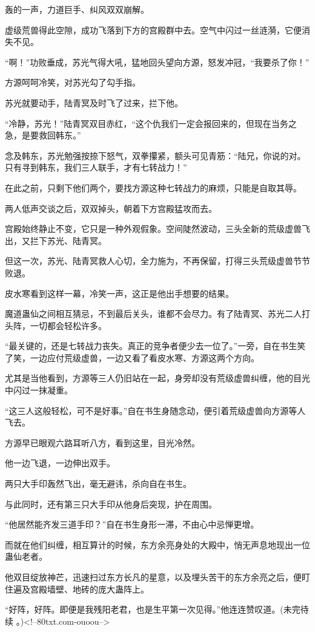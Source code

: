 \begin{this_body}
轰的一声，力道巨手、纠风双双崩解。

虚级荒兽得此空隙，成功飞落到下方的宫殿群中去。空气中闪过一丝涟漪，它便消失不见。

“啊！”功败垂成，苏光气得大吼，猛地回头望向方源，怒发冲冠，“我要杀了你！”

方源呵呵冷笑，对苏光勾了勾手指。

苏光就要动手，陆青冥及时飞了过来，拦下他。

“冷静，苏光！”陆青冥双目赤红，“这个仇我们一定会报回来的，但现在当务之急，是要救回韩东。”

念及韩东，苏光勉强按捺下怒气，双拳攥紧，额头可见青筋：“陆兄，你说的对。只有寻到韩东，我们三人联手，才有七转战力！”

在此之前，只剩下他们两个，要找方源这种七转战力的麻烦，只能是自取其辱。

两人低声交谈之后，双双掉头，朝着下方宫殿猛攻而去。

宫殿始终静止不变，它只是一种外观假象。空间陡然波动，三头全新的荒级虚兽飞出，又拦下苏光、陆青冥。

但这一次，苏光、陆青冥救人心切，全力施为，不再保留，打得三头荒级虚兽节节败退。

皮水寒看到这样一幕，冷笑一声，这正是他出手想要的结果。

魔道蛊仙之间相互猜忌，不到最后关头，谁都不会尽力。有了陆青冥、苏光二人打头阵，一切都会轻松许多。

“最关键的，还是七转战力丧失。真正的竞争者便少去一位了。”一旁，自在书生笑了笑，一边应付荒级虚兽，一边又看了看皮水寒、方源这两个方向。

尤其是当他看到，方源等三人仍旧站在一起，身旁却没有荒级虚兽纠缠，他的目光中闪过一抹凝重。

“这三人这般轻松，可不是好事。”自在书生身随念动，便引着荒级虚兽向方源等人飞去。

方源早已眼观六路耳听八方，看到这里，目光冷然。

他一边飞退，一边伸出双手。

两只大手印轰然飞出，毫无避讳，杀向自在书生。

与此同时，还有第三只大手印从他身后突现，护在周围。

“他居然能齐发三道手印？”自在书生身形一滞，不由心中忌惮更增。

而就在他们纠缠，相互算计的时候，东方余亮身处的大殿中，悄无声息地现出一位蛊仙老者。

他双目绽放神芒，迅速扫过东方长凡的星意，以及埋头苦干的东方余亮之后，便盯住遍及宫殿墙壁、地砖的庞大蛊阵上。

“好阵，好阵。即便是我残阳老君，也是生平第一次见得。”他连连赞叹道。(未完待续 。)<!--80txt.com-ouoou-->

\end{this_body}


